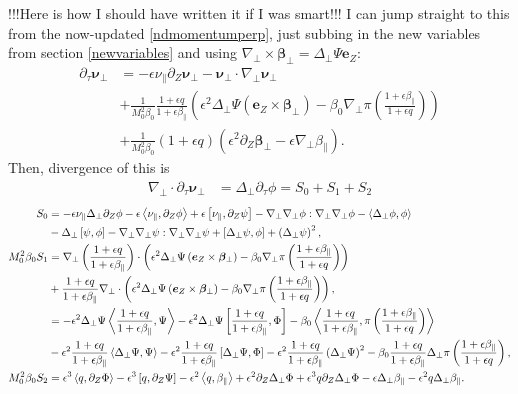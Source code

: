 \documentclass{article}
\newcommand{\para}{\parallel}
\newcommand{\ep}{\epsilon}
\newcommand{\np}{\nabla_\perp}
\newcommand{\lap}{\Delta_\perp}
\newcommand{\p}{\partial}
\newcommand{\fr}{\frac{1+\ep q}{1+\ep\beta_\para}}
\newcommand{\frinv}{\frac{1+\ep\beta_\para}{1+\ep q}}
\newcommand{\pth} [1] {\left( #1 \right) }
\newcommand{\br} [1] {\left[ #1 \right] }
\begin{document}
!!!Here is how I should have written it if I was smart!!! I can jump straight to this from the now-updated \eqref{ndmomentumperp}, just subbing in the new variables from section \ref{newvariables} and using $\np\times\bm{\beta}_\perp = \lap\Psi\bm{e}_Z$:
\begin{align} 
    \p_\tau\bm{\nu}_\perp &= -\ep\nu_\para \p_Z\bm{\nu}_\perp - \bm{\nu}_\perp \cdot\np \bm{\nu}_\perp \nonumber \\ 
        &+ \frac{1}{M_0^2\beta_0} \fr\pth{\ep^2\lap\Psi \pth{\bm{e}_Z\times\bm{\beta}_\perp} - \beta_0\np\pi\pth{\frinv}} \\ 
        &+ \frac{1}{M_0^2\beta_0} \pth{1+\ep q} \pth{\ep^2\p_Z\bm{\beta}_\perp - \ep\np\beta_\para}. 
\end{align}
Then, divergence of this is 
\begin{align*}
    \np\cdot\p_\tau\bm{\nu}_\perp &= \lap\p_\tau\phi = S_0 + S_1 + S_2
\end{align*}
\begin{align*}
    S_0 &= -\ep\nu_\para \lap \p_Z\phi - \ep\Braket{\nu_\para, \p_Z\phi} + \ep\br{\nu_\para, \p_Z\psi} - \np\np\phi:\np\np\phi - \Braket{\lap\phi, \phi} \\ 
        &- \lap\br{\psi,\phi} - \np\np\psi:\np\np\psi + \br{\lap\psi, \phi} + \pth{\lap\psi}^2, \\ 
    M_0^2\beta_0 S_1 &= \np\pth{\fr} \cdot \pth{\ep^2\lap\Psi \pth{\bm{e}_Z\times\bm{\beta}_\perp} - \beta_0\np\pi\pth{\frinv}} \\ 
        &+ \fr\np\cdot\pth{\ep^2\lap\Psi \pth{\bm{e}_Z\times\bm{\beta}_\perp} - \beta_0\np\pi\pth{\frinv}}, \\ 
        &= -\ep^2\lap\Psi\Braket{\fr, \Psi} - \ep^2\lap\Psi\br{\fr, \Phi} - \beta_0\Braket{\fr, \pi\pth{\frinv}} \\ 
        &- \ep^2\fr\Braket{\lap\Psi, \Psi} - \ep^2\fr\br{\lap\Psi, \Phi} - \ep^2\fr\pth{\lap\Psi}^2 - \beta_0\fr\lap\pi\pth{\frinv}, \\ 
    M_0^2\beta_0 S_2 &= \ep^3\Braket{q, \p_Z\Phi} - \ep^3\br{q, \p_Z\Psi} - \ep^2\Braket{q,\beta_\para} + \ep^2\p_Z\lap\Phi + \ep^3q\p_Z\lap\Phi - \ep\lap\beta_\para - \ep^2 q\lap\beta_\para. 
\end{align*}
\end{document}
